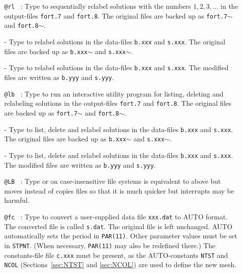 \documentclass[12pt]{report}
\begin{document}
\begin{itemize}
\item[\tt @rl]~:
  Type  to sequentially relabel solutions with the numbers $1,2,3,\ldots$
  in the output-files {\tt fort.7} and {\tt fort.8}.
  The original files are backed up as
{\tt fort.7$\sim$} and {\tt fort.8$\sim$}. 
  \item[-]
  Type  to relabel solutions
  in the data-files {\tt b.xxx} and {\tt s.xxx}.
  The original files are backed up as {\tt b.xxx$\sim$} and {\tt s.xxx$\sim$}. 
\item[-]
  Type  to relabel solutions
  in the data-files {\tt b.xxx} and {\tt s.xxx}.
  The modified files are written as {\tt b.yyy} and {\tt s.yyy}. 

\item[\tt @lb]~:
  Type  to run an interactive utility program
  for listing, deleting and relabeling solutions 
  in the output-files {\tt fort.7} and {\tt fort.8}.
  The original files are backed up as
{\tt fort.7$\sim$} and {\tt fort.8$\sim$}. 
  \item[-]
  Type  to list, delete and relabel solutions
  in the data-files {\tt b.xxx} and {\tt s.xxx}.
  The original files are backed up as {\tt b.xxx$\sim$} and {\tt s.xxx$\sim$}. 
\item[-]
  Type  to list, delete and relabel solutions
  in the data-files {\tt b.xxx} and {\tt s.xxx}.
  The modified files are written as {\tt b.yyy} and {\tt s.yyy}. 

\item[\tt @LB]~:
  Type  or  on case-insensitive file
  systems is equivalent to  above but moves instead of
  copies files so that it is much quicker but interrupts may be harmful.

\item[\tt @fc]~:
  Type  to convert a user-supplied data file {\tt xxx.dat}
  to {\cal AUTO} format. The converted file is called {\tt s.dat}.
  The original file is left unchanged.
  {\cal AUTO} automatically sets the period in {\tt PAR(11)}.
  Other parameter values must be set in {\tt STPNT}. (When necessary,
  {\tt PAR(11)} may also be redefined there.) 
  The constants-file file {\tt c.xxx} must be present, as the 
  {\cal AUTO}-constants {\tt NTST} and {\tt NCOL} 
  (Sections~\ref{sec:NTST} and \ref{sec:NCOL}) are used to define the new mesh.
  

\end{itemize}
\end{document}
